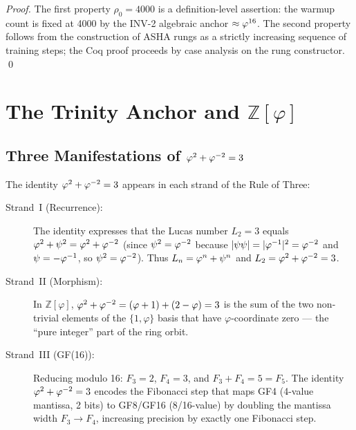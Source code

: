 

\begin{proof}
The first property \(\rho_0 = 4000\) is a definition-level assertion:
the warmup count is fixed at 4000 by the INV-2 algebraic anchor
\(\approx \varphi^{16}\).  The second property follows from the
construction of ASHA rungs as a strictly increasing sequence of training
steps; the Coq proof proceeds by case analysis on the rung constructor.
\qed
\end{proof}

\section{The Trinity Anchor and \(\mathbb{Z}[\varphi]\)}
\label{sec:ch7-trinity}

\subsection{Three Manifestations of \(\varphi^{2}+\varphi^{-2}=3\)}\label{subsec:ch7-trinity-three}

The identity \(\varphi^{2} + \varphi^{-2} = 3\) appears in each strand of
the Rule of Three:

\begin{description}
  \item[Strand~I (Recurrence):] The identity expresses that the Lucas number
    \(L_2 = 3\) equals \(\varphi^{2} + \psi^2 = \varphi^{2} + \varphi^{-2}\)
    (since \(\psi^2 = \varphi^{-2}\) because \(|\psi\psi| = |\varphi^{-1}|^2
    = \varphi^{-2}\) and \(\psi = -\varphi^{-1}\), so \(\psi^2 = \varphi^{-2}\)).
    Thus \(L_n = \varphi^{n} + \psi^n\) and \(L_2 = \varphi^{2}+\varphi^{-2}=3\).
  \item[Strand~II (Morphism):] In \(\mathbb{Z}[\varphi]\),
    \(\varphi^{2}+\varphi^{-2} = (\varphi+1)+(2-\varphi) = 3\)
    is the sum of the two non-trivial elements of the \(\{1,\varphi\}\) basis
    that have \(\varphi\)-coordinate zero — the ``pure integer'' part of the
    ring orbit.
  \item[Strand~III (GF(16)):] Reducing modulo 16:
    \(F_3 = 2\), \(F_4 = 3\), and \(F_3 + F_4 = 5 = F_5\).
    The identity \(\varphi^{2}+\varphi^{-2}=3\) encodes the Fibonacci step
    that maps GF4 (4-value mantissa, 2 bits) to GF8/GF16 (8/16-value)
    by doubling the mantissa width \(F_3 \to F_4\), increasing precision
    by exactly one Fibonacci step.
\end{description}

